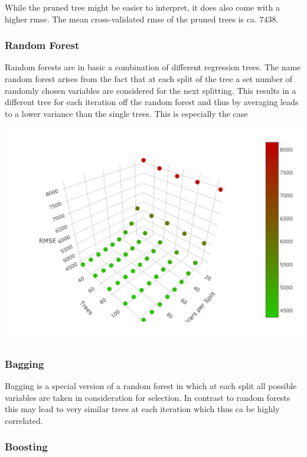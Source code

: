 \documentclass[11pt,]{article}
\begin{document}
While the pruned tree might be easier to interpret, it does also come
with a higher rmse. The mean cross-validated rmse of the pruned trees is
ca. \(7438\).

\hypertarget{random-forest}{%
\subsubsection{Random Forest}\label{random-forest}}

Random forests are in basic a combination of different regression trees.
The name random forest arises from the fact that at each split of the
tree a set number of randomly chosen variables are considered for the
next splitting. This results in a different tree for each iteration off
the random forest and thus by averaging leads to a lower variance than
the single trees. This is especially the case

\includegraphics{../00_data/output_paper/10_rf_plot.pdf}

\hypertarget{bagging}{%
\subsubsection{Bagging}\label{bagging}}

Bagging is a special version of a random forest in which at each split
all possible variables are taken in consideration for selection. In
contrast to random forests this may lead to very similar trees at each
iteration which thus ca be highly correlated.

\hypertarget{boosting}{%
\subsubsection{Boosting}\label{boosting}}
\end{document}
